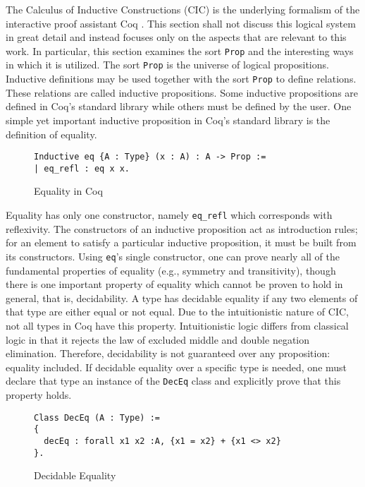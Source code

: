 The Calculus of Inductive Constructions (CIC) is the underlying formalism of the interactive proof assistant Coq \cite{CIC}. This section shall not discuss this logical system in great detail and instead focuses only on the aspects that are relevant to this work. In particular, this section examines the sort \verb|Prop| and the interesting ways in which it is utilized. The sort \verb|Prop| is the universe of logical propositions. Inductive definitions may be used together with the sort \verb|Prop| to define relations. These relations are called inductive propositions. Some inductive propositions are defined in Coq's standard library while others must be defined by the user. One simple yet important inductive proposition in Coq's standard library is the definition of equality. 
\begin{figure}[h]
\begin{lstlisting}[language=Coq]
Inductive eq {A : Type} (x : A) : A -> Prop :=
| eq_refl : eq x x.
\end{lstlisting}
\caption{Equality in Coq}
\end{figure}
Equality has only one constructor, namely \verb|eq_refl| which corresponds with reflexivity. The constructors of an inductive proposition act as introduction rules; for an element to satisfy a particular inductive proposition, it must be built from its constructors. Using \verb|eq|'s single constructor, one can prove nearly all of the fundamental properties of equality (e.g., symmetry and transitivity), though there is one important property of equality which cannot be proven to hold in general, that is, decidability. 
A type has decidable equality if any two elements of that type are either equal or not equal. Due to the intuitionistic nature of CIC, not all types in Coq have this property. Intuitionistic logic differs from classical logic in that it rejects the law of excluded middle and double negation elimination. Therefore, decidability is not guaranteed over any proposition: equality included. If decidable equality over a specific type is needed, one must declare that type an instance of the \verb|DecEq| class and explicitly prove that this property holds.
\begin{figure}[h]
\begin{lstlisting}[language=Coq]
Class DecEq (A : Type) := 
{ 
  decEq : forall x1 x2 :A, {x1 = x2} + {x1 <> x2} 
}.
\end{lstlisting}
\caption{Decidable Equality}
\end{figure}

